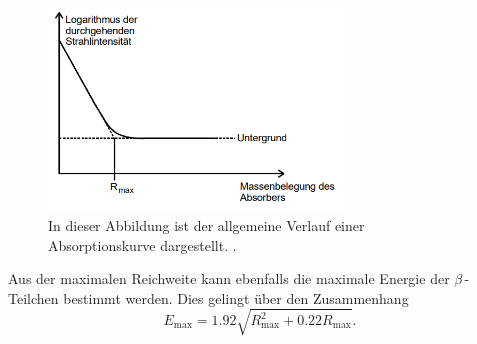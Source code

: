 \begin{figure}
    \centering
    \includegraphics[width = 0.7\textwidth]{content/Absorptionskurve.PNG}
    \caption{In dieser Abbildung ist der allgemeine Verlauf einer Absorptionskurve dargestellt. \cite{v704}.}
    \label{fig:Absorptionskurve}
\end{figure}

Aus der maximalen Reichweite kann ebenfalls die maximale Energie der $\beta$\,-Teilchen bestimmt werden. Dies gelingt über den Zusammenhang 
\begin{equation}
    \label{eqn:E_max}
    E_{\text{max}} = 1.92\sqrt{R_{\text{max}}^2 + 0.22R_{\text{max}}}.
\end{equation}
